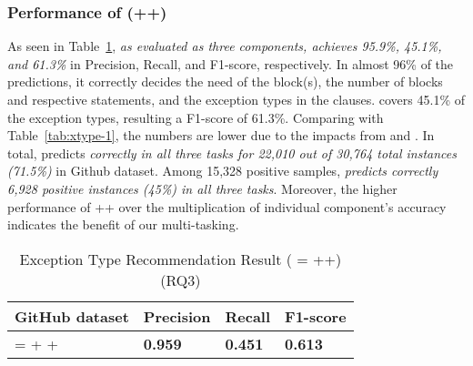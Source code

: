 \subsubsection{Performance of {\bf {\tool}} ({\xblock}+{\xstate}+{\xtype})}

As seen in Table~\ref{tab:xtype-4}, {\em {\tool} as evaluated as three
  components, achieves 95.9\%, 45.1\%, and 61.3\%} in Precision,
Recall, and F1-score, respectively. In almost 96\% of the predictions,
it correctly decides the need of the  block(s), the
number of blocks and respective statements, and the exception types
in the  clauses. {\tool} covers 45.1\% of the exception
types, resulting a F1-score of 61.3\%.
%
Comparing with Table~\ref{tab:xtype-1}, the numbers are lower due
to the impacts from \xblock and \xstate. In total,
{\tool} predicts {\em correctly in all three tasks for 22,010 out of
  30,764 total instances (71.5\%)} in Github dataset. Among 15,328
positive samples, {\em {\tool} predicts correctly 6,928 positive
  instances (45\%) in all three tasks}. Moreover, the higher
performance of {\xblock}+{\xstate}+{\xtype} over the multiplication of
individual component's accuracy indicates the benefit of our
multi-tasking.


\begin{table}[htpb]
  \caption{Exception Type Recommendation Result ({\tool} = {\xblock}+{\xstate}+{\xtype}) (RQ3)}
  \vspace{-12pt}
  \small
  \tabcolsep 3pt
	\begin{center}
		\renewcommand{\arraystretch}{1}
		\begin{tabular}{| p{4.5cm}<{\centering} | p{1cm}<{\centering} | p{1cm}<{\centering}| p{1cm}<{\centering}|}
		  \hline
			GitHub dataset  & Precision  & Recall & F1-score \\
			\hline
			{\tool} = \xblock + \xstate  + \xtype  & {\bf 0.959}  &  {\bf 0.451} & {\bf 0.613}\\
			\hline
		\end{tabular}
		\label{tab:xtype-4}
	\end{center}
\end{table}
